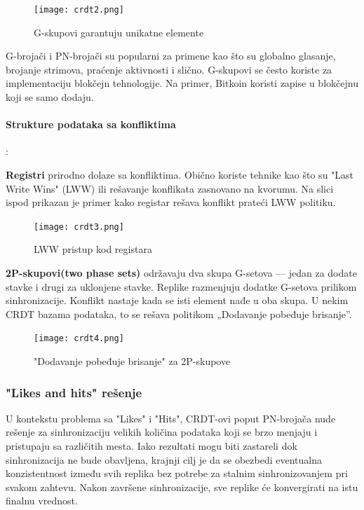 \documentclass[12pt]{article}
\begin{document}
\begin{figure}[H]
	\centering
	\texttt{[image: crdt2.png]}
	\caption{G-skupovi garantuju unikatne elemente}
	
\end{figure}

G-brojači i PN-brojači su popularni za primene kao što su globalno glasanje, brojanje strimova, praćenje aktivnosti i slično. G-skupovi se često koriste za implementaciju blokčejn tehnologije. Na primer, Bitkoin koristi zapise u blokčejnu koji se samo dodaju.

\paragraph{Strukture podataka sa konfliktima}:

\textbf{Registri} prirodno dolaze sa konfliktima. Obično koriste tehnike kao što su "Last Write Wins" (LWW) ili rešavanje konflikata zasnovano na kvorumu. Na slici ispod prikazan je primer kako registar rešava konflikt prateći LWW politiku.

\begin{figure}[H]
	\centering
	\texttt{[image: crdt3.png]}
	\caption{LWW pristup kod registara}
	
\end{figure}

\textbf{2P-skupovi(two phase sets)} održavaju dva skupa G-setova — jedan za dodate stavke i drugi za uklonjene stavke. Replike razmenjuju dodatke G-setova prilikom sinhronizacije. Konflikt nastaje kada se isti element nađe u oba skupa. U nekim CRDT bazama podataka, to se rešava politikom „Dodavanje pobeđuje brisanje”.

\begin{figure}[H]
	\centering
	\texttt{[image: crdt4.png]}
	\caption{"Dodavanje pobeđuje brisanje" za 2P-skupove}
	
\end{figure}

\subsubsection{"Likes and hits" rešenje}

U kontekstu problema sa "Likes" i "Hits", CRDT-ovi poput PN-brojača nude rešenje za sinhronizaciju velikih količina podataka koji se brzo menjaju i pristupaju sa različitih mesta. Iako rezultati mogu biti zastareli dok sinhronizacija ne bude obavljena, krajnji cilj je da se obezbedi eventualna konzistentnost između svih replika bez potrebe za stalnim sinhronizovanjem pri svakom zahtevu. Nakon završene sinhronizacije, sve replike će konvergirati na istu finalnu vrednost.
\end{document}
